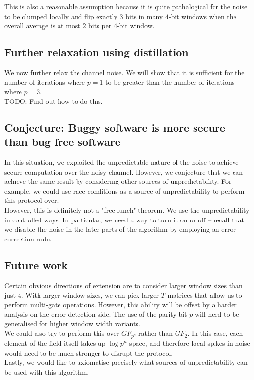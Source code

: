 This is also a reasonable assumption because it is quite pathalogical for the noise to be clumped locally and flip exactly $3$ bits in many $4$-bit windows when the overall average is at most $2$ bits per $4$-bit window.

\subsection{Further relaxation using distillation}
We now further relax the channel noise. We will show that it is sufficient for the number of iterations where $p = 1$ to be greater than the number of iterations where $p = 3$.\\

TODO: Find out how to do this.

\subsection{Conjecture: Buggy software is more secure than bug free software}

In this situation, we exploited the unpredictable nature of the noise to achieve secure computation over the noisy channel. However, we conjecture that we can achieve the same result by considering other sources of unpredictability. For example, we could use race conditions as a source of unpredictability to perform this protocol over. \\

However, this is definitely not a "free lunch" theorem. We use the unpredictability in controlled ways. In particular, we need a way to turn it on or off -- recall that we disable the noise in the later parts of the algorithm by employing an error correction code.

\subsection{Future work}
Certain obvious directions of extension are to consider larger window sizes than just 4. With larger window sizes, we can pick larger $T$ matrices that allow us to perform multi-gate operations. However, this ability will be offset by a harder analysis on the error-detection side. The use of the parity bit $p$ will need to be generalised for higher window width variants. \\

We could also try to perform this over $GF_{p^n}$ rather than $GF_{2}$. In this case, each element of the field itself takes up $\log p^n$ space, and therefore local spikes in noise would need to be much stronger to disrupt the protocol. \\

Lastly, we would like to axiomatise precisely what sources of unpredictability can be used with this algorithm.
